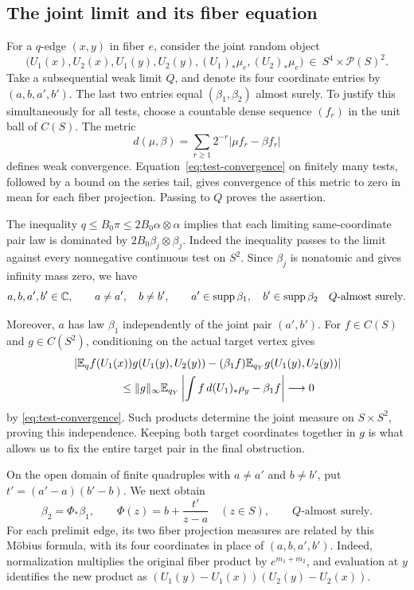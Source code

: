 \subsection{The joint limit and its fiber equation}

For a $q$-edge $(x,y)$ in fiber $e$, consider the joint random object
\[
 \bigl(U_1(x),U_2(x),U_1(y),U_2(y),
       (U_1)_*\mu_e,(U_2)_*\mu_e\bigr)
 \ \in\ S^4\times\mathcal P(S)^2.
\]
Take a subsequential weak limit $Q$, and denote its four coordinate
entries by $(a,b,a',b')$.
The last two entries equal $(\beta_1,\beta_2)$ almost surely.
To justify this simultaneously for all tests, choose a countable
dense sequence $(f_r)$ in the unit ball of $C(S)$.  The metric
\[
 d(\mu,\beta)=\sum_{r\ge1}2^{-r}|\mu f_r-\beta f_r|
\]
defines weak convergence.  Equation~\eqref{eq:test-convergence}
on finitely many tests, followed by a bound on the series tail,
gives convergence of this metric to zero in mean for each fiber
projection.  Passing to $Q$ proves the assertion.

The inequality $q\le B_0\pi\le2B_0\alpha\otimes\alpha$ implies that
each limiting same-coordinate pair law is dominated by
$2B_0\beta_j\otimes\beta_j$.  Indeed the inequality passes to the
limit against every nonnegative continuous test on $S^2$.
Since $\beta_j$ is nonatomic and gives infinity mass zero, we have
\[
 a,b,a',b'\in\mathbb C,\qquad a\ne a',\quad b\ne b',
 \qquad a'\in\operatorname{supp}\beta_1,\quad b'\in\operatorname{supp}\beta_2
 \quad\text{$Q$-almost surely}.
\]

Moreover, $a$ has law $\beta_1$ independently of the joint pair
$(a',b')$.  For $f\in C(S)$ and $g\in C(S^2)$, conditioning on the
actual target vertex gives
\begin{align*}
 &\left|\E_q f(U_1(x))g(U_1(y),U_2(y))
     -(\beta_1f)\E_{q_Y}g(U_1(y),U_2(y))\right|\\
 &\hspace{15mm}\le
 \|g\|_\infty\E_{q_Y}
       \left|\int f\,d(U_1)_*\rho_y-\beta_1f\right|
 \longrightarrow0
\end{align*}
by \eqref{eq:test-convergence}.  Such products determine the joint
measure on $S\times S^2$, proving this independence.
Keeping both target coordinates together in $g$ is what allows us to
fix the entire target pair in the final obstruction.

On the open domain of finite quadruples with $a\ne a'$ and $b\ne b'$,
put $t'=(a'-a)(b'-b)$.  We next obtain
\begin{equation}\label{eq:mobius}
 \beta_2=\Phi_*\beta_1,\qquad
 \Phi(z)=b+\frac{t'}{z-a}
 \quad(z\in S),
 \qquad Q\text{-almost surely}.
\end{equation}
For each prelimit edge, its two fiber projection measures are related by
this M\"obius formula, with its four coordinates in place of
$(a,b,a',b')$.  Indeed, normalization multiplies the original fiber product by
$e^{m_1+m_2}$, and evaluation at $y$ identifies the new product as
$(U_1(y)-U_1(x))(U_2(y)-U_2(x))$.

